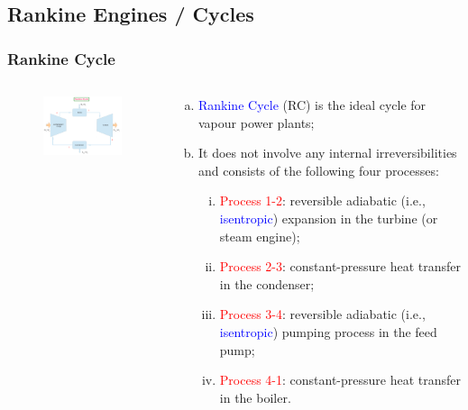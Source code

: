 \documentclass[10pt,compress]{beamer}
\newcommand{\blue}{\textcolor{blue}}
\begin{document}

\subsection{Rankine Engines / Cycles}

\begin{frame}
 \frametitle{Rankine Cycle}
 \begin{columns}
   \begin{column}[c]{0.5\linewidth}
    \begin{figure}%
     \begin{center}
      \includegraphics[width=6.5cm,clip]{./Pics/Simple_Rankine_Cycle}
     \end{center}
    \end{figure}  
   \end{column}
   \begin{column}[l]{0.5\linewidth}
    \begin{enumerate}[(a)]\scriptsize
     \item<1->\textcolor{blue}{Rankine Cycle} (RC) is the ideal cycle for vapour power plants;
     \item<2-> It does not involve any internal irreversibilities and consists of the following four processes:
     \begin{enumerate}[(i)]\scriptsize
      \item<3-> \textcolor{red}{Process 1-2}: reversible adiabatic (i.e., \blue{isentropic}) expansion in the turbine (or steam engine);
      \item<4-> \textcolor{red}{Process 2-3}: constant-pressure heat transfer in the condenser;
      \item<5-> \textcolor{red}{Process 3-4}: reversible adiabatic (i.e., \blue{isentropic}) pumping process in the feed pump;
      \item<6-> \textcolor{red}{Process 4-1}: constant-pressure heat transfer in the boiler.  
     \end{enumerate}

\end{enumerate}
\end{column}
\end{columns}
\end{frame}
\end{document}
